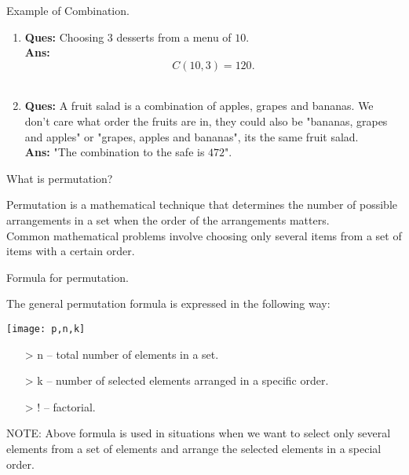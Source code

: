 \documentclass{beamer}
\begin{document}
	\begin{frame}{Example of Combination.}
		\begin{enumerate}
			\item \textbf{Ques:} Choosing $3$ desserts from a menu of $10$. \\ \textbf{Ans:} \[C(10,3) = 120. \] \\
			\item \textbf{Ques:} A fruit salad is a combination of apples, grapes and bananas. We don't care what order the fruits are in, they could also be "bananas, grapes and apples" or "grapes, apples and bananas", its the same fruit salad. \\ \textbf{Ans:} "The combination to the safe is $472$".
		\end{enumerate}
	\end{frame}
	
	\begin{frame}{What is permutation?}
		\begin{block}{}
		Permutation is a mathematical technique that determines the number of possible arrangements in a set when the order of the arrangements matters.\\ Common mathematical problems involve choosing only several items from a set of items with a certain order.
		\end{block}
	\end{frame}
	
	\begin{frame}{Formula for permutation.}
		\begin{block}{}
		The general permutation formula is expressed in the following way:
		\end{block}
		\texttt{[image: p,n,k]}
		\begin{itemize}
			\item[>] n – total number of elements in a set.\\
			\item[>] k – number of selected elements arranged in a specific order.\\
			\item[>] ! – factorial.
		\end{itemize}\pause
		\begin{block}{NOTE:}
			Above formula is used in situations when we want to select only several elements from a set of elements and arrange the selected elements in a special order.
		\end{block}
	\end{frame}
	
\end{document}
